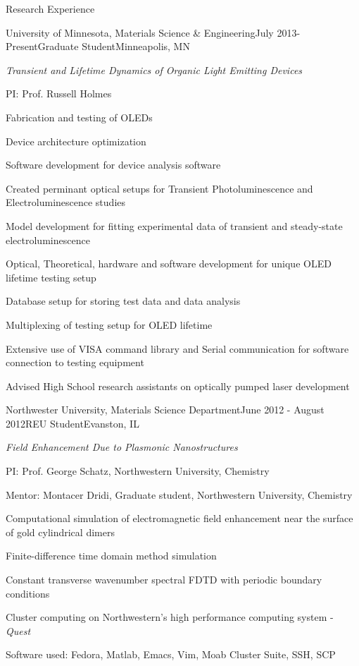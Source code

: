 \documentclass{resume} %
\begin{document}
\begin{rSection}{Research Experience}

\begin{rSubsection}{University of Minnesota, Materials Science \& Engineering}{July 2013-Present}{Graduate Student}{Minneapolis, MN}

\item {\em Transient and Lifetime Dynamics of Organic Light Emitting Devices}

\item PI: Prof. Russell Holmes
\item Fabrication and testing of OLEDs
\item Device architecture optimization
\item Software development for device analysis software
\item Created perminant optical setups for Transient Photoluminescence and Electroluminescence studies
\item Model development for fitting experimental data of transient and steady-state electroluminescence
\item Optical, Theoretical, hardware and software development for unique OLED lifetime testing setup
\item Database setup for storing test data and data analysis
\item Multiplexing of testing setup for OLED lifetime
\item Extensive use of VISA command library and Serial communication for software connection to testing equipment
\item Advised High School research assistants on optically pumped laser development

\end{rSubsection}


\begin{rSubsection}{Northwester University, Materials Science Department}{June 2012 - August 2012}{REU Student}{Evanston, IL}

\item {\em Field Enhancement Due to Plasmonic Nanostructures}

\item PI: Prof. George Schatz, Northwestern University, Chemistry 
\item Mentor: Montacer Dridi, Graduate student, Northwestern University, Chemistry 
\item Computational simulation of electromagnetic field enhancement near the surface of gold cylindrical dimers
\item Finite-difference time domain method simulation 
\item Constant transverse wavenumber spectral FDTD with periodic boundary conditions 
\item Cluster computing on Northwestern's high performance computing system - {\em Quest}
\item Software used: Fedora, Matlab, Emacs, Vim, Moab Cluster Suite, SSH, SCP
\end{rSubsection}


\end{rSection}
\end{document}
